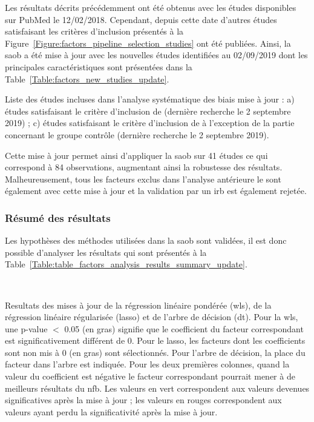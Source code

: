 Les résultats décrits précédemment ont été obtenus avec les études disponibles sur PubMed le 12/02/2018. Cependant, depuis cette date d'autres études satisfaisant
les critères d'inclusion présentés à la Figure~\ref{Figure:factors_pipeline_selection_studies} ont été publiées. Ainsi, la \gls{saob} a été mise à jour avec les 
nouvelles études identifiées au 02/09/2019 dont les principales caractéristiques sont présentées dans la Table~\ref{Table:factors_new_studies_update}.

\begin{table}[h!]
  \centering
  \caption{Liste des études incluses dans l'analyse systématique des biais mise à jour : a) études satisfaisant le critère d'inclusion de \citet{Cortese2016} (dernière recherche 
	le 2 septembre 2019) ; c) études satisfaisant le critère d'inclusion de \citet{Cortese2016} à l'exception de la partie concernant le groupe contrôle 
	(dernière recherche le 2 septembre 2019).}
  
  \label{Table:factors_new_studies_update}
\end{table}

Cette mise à jour permet ainsi d'appliquer la \gls{saob} sur 41 études ce qui correspond à 84 observations, augmentant ainsi la robustesse des
résultats. Malheureusement, tous les facteurs exclus dans l'analyse antérieure le sont également avec cette mise à jour et la validation par
un \gls{irb} est également rejetée.

\subsubsection{Résumé des résultats} 

Les hypothèses des méthodes utilisées dans la \gls{saob} sont validées, il est donc possible d'analyser les résultats qui sont présentés à la 
Table~\ref{Table:table_factors_analysis_results_summary_update}.

\newpage\
\begin{table}[h!]
  \centering
  \caption{Resultats des mises à jour de la régression linéaire pondérée (\gls{wls}), de la régression linéaire régularisée (\gls{lasso}) et de l'arbre de décision (\gls{dt}). Pour la \gls{wls}, une p-value $<$ 0.05 
	(en gras) signifie que le coefficient du facteur correspondant est significativement différent de 0. Pour le \gls{lasso}, les facteurs dont les coefficients sont non mis à 0 (en gras) sont 
	sélectionnés. Pour l'arbre de décision, la place du facteur dans l'arbre est indiquée. Pour les deux premières colonnes, quand la valeur du coefficient est négative le facteur 
	correspondant pourrait mener à de meilleurs résultats du \gls{nfb}. Les valeurs en vert correspondent aux valeurs devenues significatives après la mise à jour ; les valeurs
	en rouges correspondent aux valeurs ayant perdu la significativité après la mise à jour.}
  
  \label{Table:table_factors_analysis_results_summary_update}
\end{table}

